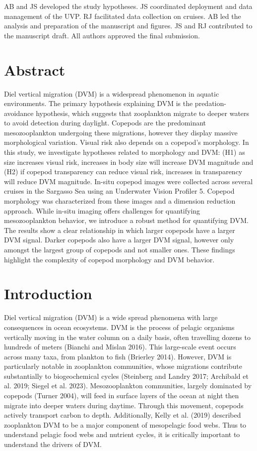 \documentclass[
]{article}
\begin{document}
AB and JS developed the study hypotheses. JS coordinated deployment and
data management of the UVP. RJ facilitated data collection on cruises.
AB led the analysis and preparation of the manuscript and figures. JS
and RJ contributed to the manuscript draft. All authors approved the
final submission.

\hypertarget{abstract}{%
\section{Abstract}\label{abstract}}

Diel vertical migration (DVM) is a widespread phenomenon in aquatic
environments. The primary hypothesis explaining DVM is the
predation-avoidance hypothesis, which suggests that zooplankton migrate
to deeper waters to avoid detection during daylight. Copepods are the
predominant mesozooplankton undergoing these migrations, however they
display massive morphological variation. Visual risk also depends on a
copepod's morphology. In this study, we investigate hypotheses related
to morphology and DVM: (H1) as size increases visual risk, increases in
body size will increase DVM magnitude and (H2) if copepod transparency
can reduce visual risk, increases in transparency will reduce DVM
magnitude. In-situ copepod images were collected across several cruises
in the Sargasso Sea using an Underwater Vision Profiler 5. Copepod
morphology was characterized from these images and a dimension reduction
approach. While in-situ imaging offers challenges for quantifying
mesozooplankton behavior, we introduce a robust method for quantifying
DVM. The results show a clear relationship in which larger copepods have
a larger DVM signal. Darker copepods also have a larger DVM signal,
however only amongst the largest group of copepods and not smaller ones.
These findings highlight the complexity of copepod morphology and DVM
behavior.

\hypertarget{introduction}{%
\section{Introduction}\label{introduction}}

Diel vertical migration (DVM) is a wide spread phenomena with large
consequences in ocean ecosystems. DVM is the process of pelagic
organisms vertically moving in the water column on a daily basis, often
travelling dozens to hundreds of meters (Bianchi and Mislan 2016). This
large-scale event occurs across many taxa, from plankton to fish
(Brierley 2014). However, DVM is particularly notable in zooplankton
communities, whose migrations contribute substantially to biogeochemical
cycles (Steinberg and Landry 2017; Archibald et al. 2019; Siegel et al.
2023). Mesozooplankton communities, largely dominated by copepods
(Turner 2004), will feed in surface layers of the ocean at night then
migrate into deeper waters during daytime. Through this movement,
copepods actively transport carbon to depth. Additionally, Kelly et al.
(2019) described zooplankton DVM to be a major component of mesopelagic
food webs. Thus to understand pelagic food webs and nutrient cycles, it
is critically important to understand the drivers of DVM.
\end{document}
